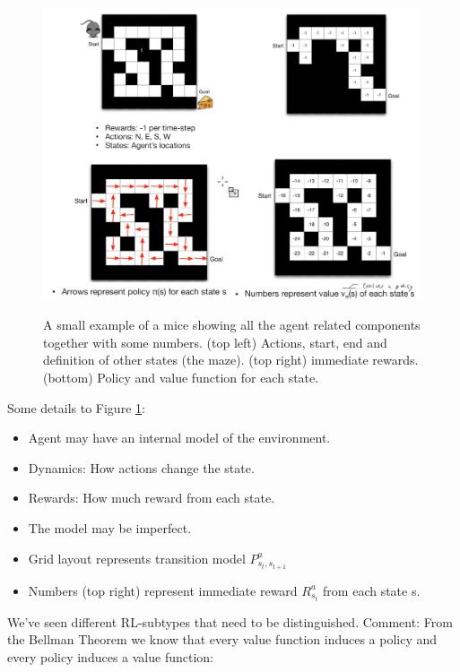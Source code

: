 \documentclass[main]{subfiles}
\begin{document}
\begin{figure}[H]
	\centering
	\includegraphics[width=1\linewidth]{08_ReinforcementLearning/figures/rl-example.png}
	\label{fig:rl-example}
	\caption{A small example of a mice showing all the agent related components together with some numbers. (top left) Actions, start, end and definition of other states (the maze). (top right) immediate rewards. (bottom) Policy and value function for each state.}
\end{figure}

Some details to Figure \ref{fig:rl-example}:
\begin{itemize}
    \item Agent may have an internal model of the environment.
    \item Dynamics: How actions change the state.
    \item Rewards: How much reward from each state.
    \item The model may be imperfect.
    \item Grid layout represents transition model $P_{s_t,s_{t+1}}^a$
    \item Numbers (top right) represent immediate reward $R_{s_t}^a$ from each state s.
\end{itemize}

We've seen different RL-subtypes that need to be distinguished. Comment: From the Bellman Theorem we know that every value function induces a policy and every policy induces a value function:
\end{document}

